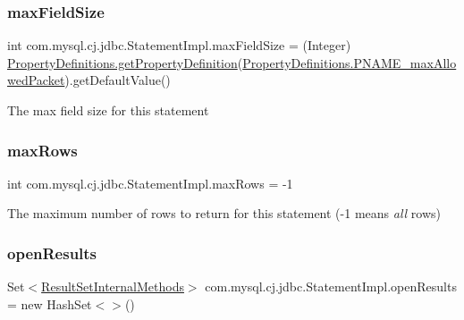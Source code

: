 \subsubsection{\texorpdfstring{max\+Field\+Size}{maxFieldSize}}
{\footnotesize\ttfamily int com.\+mysql.\+cj.\+jdbc.\+Statement\+Impl.\+max\+Field\+Size = (Integer) \mbox{\hyperlink{classcom_1_1mysql_1_1cj_1_1conf_1_1_property_definitions_afd49a84fa2e960cf885e7925aa9d0157}{Property\+Definitions.\+get\+Property\+Definition}}(\mbox{\hyperlink{classcom_1_1mysql_1_1cj_1_1conf_1_1_property_definitions_a12f43563b2f4047d96e88f0b90244c83}{Property\+Definitions.\+P\+N\+A\+M\+E\+\_\+max\+Allowed\+Packet}}).get\+Default\+Value()\hspace{0.3cm}{\ttfamily [protected]}}

The max field size for this statement \mbox{\label{classcom_1_1mysql_1_1cj_1_1jdbc_1_1_statement_impl_aa64fae9361367a5f37523a7031bb0e69}} 
\subsubsection{\texorpdfstring{max\+Rows}{maxRows}}
{\footnotesize\ttfamily int com.\+mysql.\+cj.\+jdbc.\+Statement\+Impl.\+max\+Rows = -\/1}

The maximum number of rows to return for this statement (-\/1 means {\itshape all} rows) \mbox{\label{classcom_1_1mysql_1_1cj_1_1jdbc_1_1_statement_impl_a812055d2262412bf71c9553cb0e7640c}} 
\subsubsection{\texorpdfstring{open\+Results}{openResults}}
{\footnotesize\ttfamily Set$<$\mbox{\hyperlink{interfacecom_1_1mysql_1_1cj_1_1jdbc_1_1result_1_1_result_set_internal_methods}{Result\+Set\+Internal\+Methods}}$>$ com.\+mysql.\+cj.\+jdbc.\+Statement\+Impl.\+open\+Results = new Hash\+Set$<$$>$()\hspace{0.3cm}{\ttfamily [protected]}}

